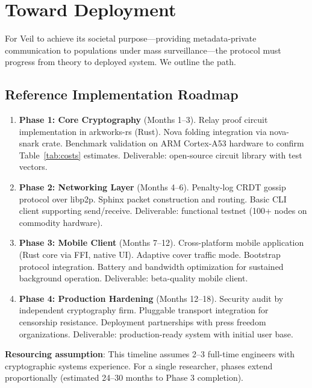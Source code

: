 \documentclass[11pt,a4paper]{article}
\begin{document}

\section{Toward Deployment}
\label{sec:deployment}

For Veil to achieve its societal purpose---providing metadata-private communication to populations under mass surveillance---the protocol must progress from theory to deployed system. We outline the path.

\subsection{Reference Implementation Roadmap}

\begin{enumerate}
    \item \textbf{Phase 1: Core Cryptography} (Months 1--3). Relay proof circuit implementation in arkworks-rs (Rust). Nova folding integration via nova-snark crate. Benchmark validation on ARM Cortex-A53 hardware to confirm Table~\ref{tab:costs} estimates. Deliverable: open-source circuit library with test vectors.

    \item \textbf{Phase 2: Networking Layer} (Months 4--6). Penalty-log CRDT gossip protocol over libp2p. Sphinx packet construction and routing. Basic CLI client supporting send/receive. Deliverable: functional testnet (100+ nodes on commodity hardware).

    \item \textbf{Phase 3: Mobile Client} (Months 7--12). Cross-platform mobile application (Rust core via FFI, native UI). Adaptive cover traffic mode. Bootstrap protocol integration. Battery and bandwidth optimization for sustained background operation. Deliverable: beta-quality mobile client.

    \item \textbf{Phase 4: Production Hardening} (Months 12--18). Security audit by independent cryptography firm. Pluggable transport integration for censorship resistance. Deployment partnerships with press freedom organizations. Deliverable: production-ready system with initial user base.
\end{enumerate}

\textbf{Resourcing assumption}: This timeline assumes 2--3 full-time engineers with cryptographic systems experience. For a single researcher, phases extend proportionally (estimated 24--30 months to Phase 3 completion).
\end{document}
